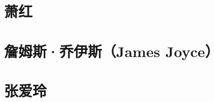 \documentclass[12pt,utf8]{book}
\begin{document}
% 


\chapter{萧红}



 


\chapter{詹姆斯·乔伊斯（James Joyce）}


\clearpage



\chapter{张爱玲}

















% 




\clearpage


% 
\end{document}
